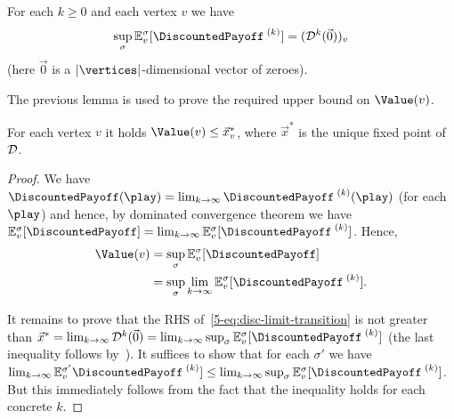 \begin{lemma}
\label{5-lem:disc-iterates}
For each $k\geq 0$ and each vertex $v$ we have 
$$\sup_{\sigma}\expv^{\sigma}_{v}[\dPayoffStep{k}] = 
(\discOP^k(\vec{0}))_v$$ 
(here $\vec{0}$ is a $|\vertices|$-dimensional vector of zeroes).
\end{lemma}

The previous lemma is used to prove the required upper bound on $\Value(v)$.

\begin{lemma}
\label{5-lem:disc-val-upper}
For each vertex $v$ it holds 
$\Value(v)\leq \vec{x}^*_v$, where $\vec{x}^*$ is the 
unique fixed point of $\mathcal{D}$.
\end{lemma}
\begin{proof}
%
We have $\DiscountedPayoff(\play) = \lim_{k\rightarrow 
\infty}\dPayoffStep{k}(\play)$ (for each $\play$) and hence, by 
dominated 
convergence theorem we have $\expv^\sigma_v[\DiscountedPayoff] = 
\lim_{k\rightarrow 
\infty}\expv^\sigma_v[\dPayoffStep{k}]$. 
Hence,
%
\begin{align}
\Value(v) &= \sup_{\sigma}\expv^\sigma_v[\DiscountedPayoff] \nonumber\\
&= \sup_{\sigma}\lim_{k\rightarrow \infty}\expv^\sigma_v[\dPayoffStep{k}] 
\label{5-eq:disc-limit-transition}.
\end{align}

\noindent
It remains to prove that the RHS of~\eqref{5-eq:disc-limit-transition} is not 
greater than $\vec{x}^*= \lim_{k\rightarrow 
\infty}\discOP^k(\vec{0})=\lim_{k\rightarrow \infty} 
\sup_{\sigma}\expv^\sigma_v[\dPayoffStep{k}]$ (the last inequality follows 
by~). It suffices to 
show that for each $\sigma'$ we have $\lim_{k\rightarrow 
\infty}\expv^{\sigma'}_v\dPayoffStep{k}] \leq \lim_{k\rightarrow 
\infty}\sup_{\sigma}\expv^\sigma_v[\dPayoffStep{k}]$. But this immediately 
follows from the fact that the inequality holds for each concrete $k$.
\end{proof}

